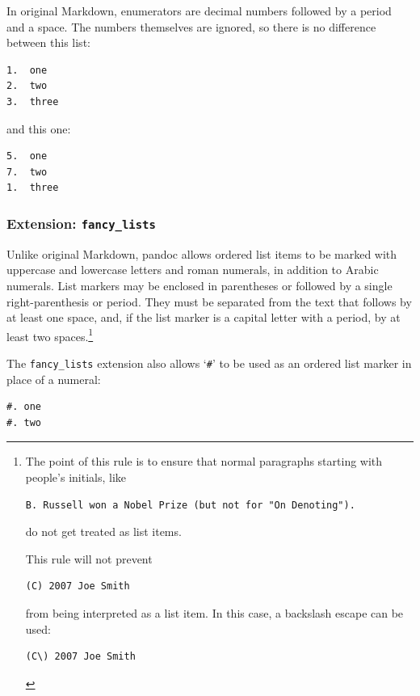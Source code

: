 \documentclass[
]{article}
\begin{document}
In original Markdown, enumerators are decimal numbers followed by a
period and a space. The numbers themselves are ignored, so there is no
difference between this list:

\begin{verbatim}
1.  one
2.  two
3.  three
\end{verbatim}

and this one:

\begin{verbatim}
5.  one
7.  two
1.  three
\end{verbatim}

\hypertarget{extension-fancy_lists}{%
\subsubsection{\texorpdfstring{Extension:
\texttt{fancy\_lists}}{Extension: fancy\_lists}}\label{extension-fancy_lists}}

Unlike original Markdown, pandoc allows ordered list items to be marked
with uppercase and lowercase letters and roman numerals, in addition to
Arabic numerals. List markers may be enclosed in parentheses or followed
by a single right-parenthesis or period. They must be separated from the
text that follows by at least one space, and, if the list marker is a
capital letter with a period, by at least two spaces.\footnote{The point
  of this rule is to ensure that normal paragraphs starting with
  people's initials, like

\begin{Verbatim}
B. Russell won a Nobel Prize (but not for "On Denoting").
\end{Verbatim}

  do not get treated as list items.

  This rule will not prevent

\begin{Verbatim}
(C) 2007 Joe Smith
\end{Verbatim}

  from being interpreted as a list item. In this case, a backslash
  escape can be used:

\begin{Verbatim}
(C\) 2007 Joe Smith
\end{Verbatim}
}

The \texttt{fancy\_lists} extension also allows `\texttt{\#}' to be used
as an ordered list marker in place of a numeral:

\begin{verbatim}
#. one
#. two
\end{verbatim}
\end{document}
